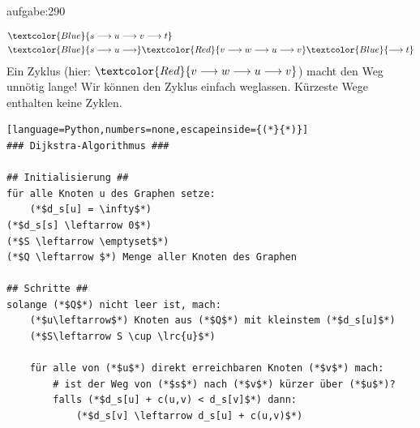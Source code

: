\begin{antwort}{aufgabe:290}
\begin{figure}[H]
\centering
{}
\end{figure}
    \begin{align*}
        &\textcolor{Blue}{s \longrightarrow u \longrightarrow v \longrightarrow t} \\
        &\textcolor{Blue}{s \longrightarrow u \longrightarrow} \textcolor{Red}{ v \longrightarrow w \longrightarrow u \longrightarrow v} \textcolor{Blue}{\longrightarrow  t}\\
    \end{align*}
Ein Zyklus (hier: $\textcolor{Red}{ v \longrightarrow w \longrightarrow u \longrightarrow v}$) macht den Weg unnötig lange! Wir können den Zyklus einfach weglassen. Kürzeste Wege enthalten keine Zyklen.
\end{antwort}

\clearpage
\begin{lstlisting}[language=Python,numbers=none,escapeinside={(*}{*)}]
### Dijkstra-Algorithmus ###

## Initialisierung ##
für alle Knoten u des Graphen setze:
    (*$d_s[u] = \infty$*)
(*$d_s[s] \leftarrow 0$*)
(*$S \leftarrow \emptyset$*)
(*$Q \leftarrow $*) Menge aller Knoten des Graphen

## Schritte ##
solange (*$Q$*) nicht leer ist, mach:
    (*$u\leftarrow$*) Knoten aus (*$Q$*) mit kleinstem (*$d_s[u]$*)
    (*$S\leftarrow S \cup \lrc{u}$*)

    für alle von (*$u$*) direkt erreichbaren Knoten (*$v$*) mach:
        # ist der Weg von (*$s$*) nach (*$v$*) kürzer über (*$u$*)?
        falls (*$d_s[u] + c(u,v) < d_s[v]$*) dann:
            (*$d_s[v] \leftarrow d_s[u] + c(u,v)$*)
\end{lstlisting}


\shipoutAnswer

